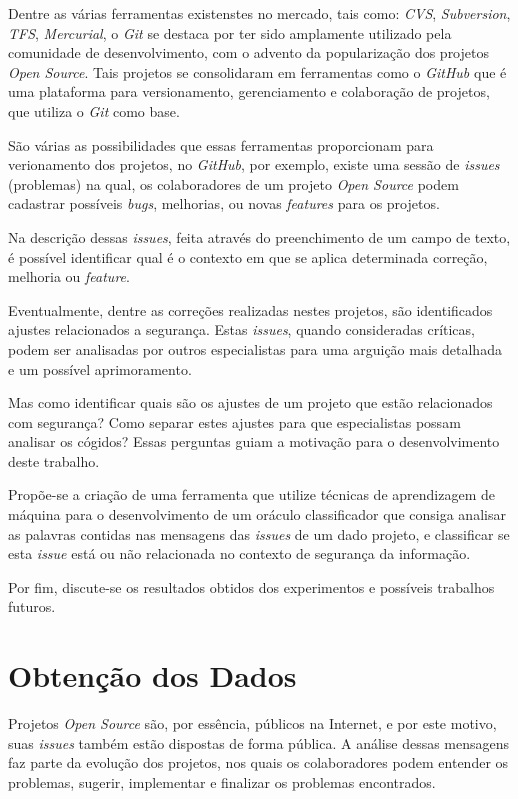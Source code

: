 \documentclass[conference]{IEEEtran}
\begin{document}
Dentre as várias ferramentas existenstes no mercado, tais como: \textit{CVS}, \textit{Subversion}, \textit{TFS}, \textit{Mercurial}, o \textit{Git} se destaca por ter sido amplamente utilizado pela comunidade de desenvolvimento, com o advento da popularização dos projetos \textit{Open Source}. Tais projetos se consolidaram em ferramentas como o \textit{GitHub} que é uma plataforma para versionamento, gerenciamento e colaboração de projetos, que utiliza o \textit{Git} como base. \cite{Scott:ProGit}

São várias as possibilidades que essas ferramentas proporcionam para verionamento dos projetos, no \textit{GitHub}, por exemplo, existe uma sessão de \textit{issues} (problemas) na qual, os colaboradores de um projeto \textit{Open Source} podem cadastrar possíveis \textit{bugs}, melhorias, ou novas \textit{features} para os projetos.

Na descrição dessas \textit{issues}, feita através do preenchimento de um campo de texto, é possível identificar qual é o contexto em que se aplica determinada correção, melhoria ou \textit{feature}.

Eventualmente, dentre as correções realizadas nestes projetos, são identificados ajustes relacionados a segurança. Estas \textit{issues}, quando consideradas críticas, podem ser analisadas por outros especialistas para uma arguição mais detalhada e um possível aprimoramento.

Mas como identificar quais são os ajustes de um projeto que estão relacionados com segurança? Como separar estes ajustes para que especialistas possam analisar os cógidos? Essas perguntas guiam a motivação para o desenvolvimento deste trabalho.

Propõe-se a criação de uma ferramenta que utilize técnicas de aprendizagem de máquina para o desenvolvimento de um oráculo classificador que consiga analisar as palavras contidas nas mensagens das \textit{issues} de um dado projeto, e classificar se esta \textit{issue} está ou não relacionada no contexto de segurança da informação.

Por fim, discute-se os resultados obtidos dos experimentos e possíveis trabalhos futuros.

\section{Obtenção dos Dados}

Projetos \textit{Open Source} são, por essência, públicos na Internet, e por este motivo, suas \textit{issues} também estão dispostas de forma pública. A análise dessas mensagens faz parte da evolução dos projetos, nos quais os colaboradores podem entender os problemas, sugerir, implementar e finalizar os problemas encontrados.
\end{document}
